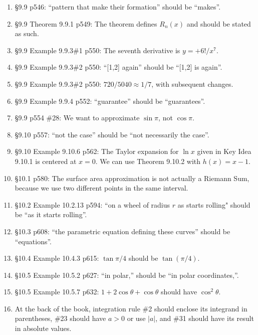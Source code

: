 \documentclass{amsart}
\begin{document}
\begin{enumerate}
\item \S9.9 p546: ``pattern that make their formation'' should be ``makes''.
\item \S9.9 Theorem 9.9.1 p549: The theorem defines $R_n(x)$ and should be stated as such.
\item \S9.9 Example 9.9.3\#1 p550: The seventh derivative is $y=+6!/x^7$.
\item \S9.9 Example 9.9.3\#2 p550: ``[1,2] again'' should be ``[1,2] is again''.
\item \S9.9 Example 9.9.3\#2 p550: $720/5040\approx1/7$, with subsequent changes.
\item \S9.9 Example 9.9.4 p552: ``guarantee'' should be ``guarantees''.
\item \S9.9 p554 \#28: We want to approximate $\sin\pi$, not $\cos\pi$.
\item \S9.10 p557: ``not the case'' should be ``not necessarily the case''.
\item \S9.10 Example 9.10.6 p562: The Taylor expansion for $\ln x$ given in Key Idea 9.10.1 is centered at $x=0$.  We can use Theorem 9.10.2 with $h(x)=x-1$.
\item \S10.1 p580: The surface area approximation is not actually a Riemann Sum, because we use two different points in the same interval.
\item \S10.2 Example 10.2.13 p594: ``on a wheel of radius $r$ as starts rolling" should be ``as it starts rolling''.
\item \S10.3 p608: ``the parametric equation defining these curves'' should be ``equations''.
\item \S10.4 Example 10.4.3 p615: $\tan\pi/4$ should be $\tan(\pi/4)$.
\item \S10.5 Example 10.5.2 p627: ``in polar,'' should be ``in polar coordinates,''.
\item \S10.5 Example 10.5.7 p632: $1+2\cos\theta+\cos\theta$ should have $\cos^2\theta$.
\item At the back of the book, integration rule \#2 should enclose its integrand in parentheses, \#23 should have $a>0$ or use $|a|$, and \#31 should have its result in absolute values.
\label{2021-06-00II}
\end{enumerate}

\clearpage
\end{document}
